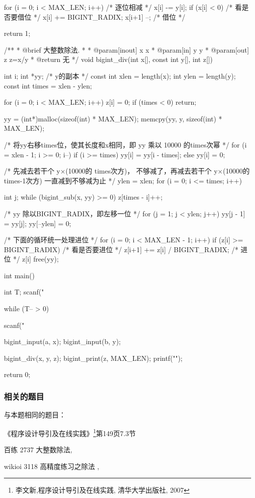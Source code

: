 \begin{Codex}[label=bigint_div.c]
{    for (i = 0; i < MAX_LEN; i++) {  /* 逐位相减 */
        x[i] -= y[i];
        if (x[i] < 0) {  /* 看是否要借位 */
            x[i] += BIGINT_RADIX;
            x[i+1] --;  /* 借位 */
        }
    }

    return 1;
}

/**
 * @brief 大整数除法.
 *
 * @param[inout] x x
 * @param[in] y y
 * @param[out] z z=x/y
 * @return 无
 */
void bigint_div(int x[], const int y[], int z[]) {
    int i;
    int *yy; /* y的副本 */
    const int xlen = length(x);
    int ylen = length(y);
    const int times = xlen - ylen;

    for (i = 0; i < MAX_LEN; i++) z[i] = 0;
    if (times < 0) return;

    yy = (int*)malloc(sizeof(int) * MAX_LEN);
    memcpy(yy, y, sizeof(int) * MAX_LEN);


    /* 将yy右移times位，使其长度和x相同，即 yy 乘以 10000 的times次幂 */
    for (i = xlen - 1; i >= 0; i--) {
        if (i >= times) yy[i] = yy[i - times];
        else yy[i] = 0;
    }

    /* 先减去若干个 y×(10000的 times次方)， 
      不够减了，再减去若干个 y×(10000的 times-1次方)
      一直减到不够减为止 */
    ylen = xlen;
    for (i = 0; i <= times; i++) {
        int j;
        while (bigint_sub(x, yy) >= 0) {
            z[times - i]++;
        }

        /* yy 除以BIGINT_RADIX，即左移一位 */
        for (j = 1; j < ylen; j++) {
            yy[j - 1] = yy[j];
        }
        yy[--ylen] = 0;
    }

    /* 下面的循环统一处理进位 */
    for (i = 0; i < MAX_LEN - 1; i++) {
        if (z[i] >= BIGINT_RADIX) {  /* 看是否要进位 */
            z[i+1] += z[i] / BIGINT_RADIX;  /* 进位 */
            z[i] %
        }
    }
    free(yy);
}

int main() {
    int T;    
    scanf("%

    while (T-- > 0) {
        scanf("%

        bigint_input(a, x);
        bigint_input(b, y);

        bigint_div(x, y, z);
        bigint_print(z, MAX_LEN);
        printf("\n"); 
    }
    return 0;
}
\end{Codex}

\subsubsection{相关的题目}
与本题相同的题目：
\begindot
\item 《程序设计导引及在线实践》\footnote{李文新,程序设计导引及在线实践, 清华大学出版社, 2007}第149页7.3节
\item 百练 2737 大整数除法, 
\item wikioi 3118 高精度练习之除法 , 
\myenddot

